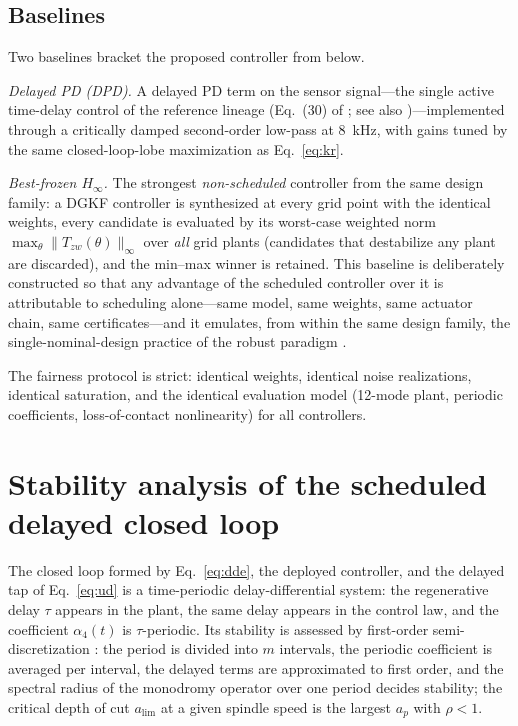 \documentclass[preprint,12pt]{elsarticle}
\newcommand{\hinf}{H_\infty}
\begin{document}
\subsection{Baselines}
\label{sec:baselines}

Two baselines bracket the proposed controller from below.

\emph{Delayed PD (DPD).} A delayed PD term on the sensor signal---the
single active time-delay control of the reference lineage
(Eq.~(30) of \cite{du2024robust}; see also
\cite{du2022timedelay,li2022displacement})---implemented through a
critically damped second-order low-pass at 8~kHz, with gains tuned by
the same closed-loop-lobe maximization as Eq.~\eqref{eq:kr}.

\emph{Best-frozen $\hinf$.} The strongest \emph{non-scheduled}
controller from the same design family: a DGKF controller is synthesized
at every grid point with the identical weights, every candidate is
evaluated by its worst-case weighted norm
$\max_\theta \| T_{zw}(\theta) \|_\infty$ over \emph{all} grid plants
(candidates that destabilize any plant are discarded), and the min--max
winner is retained. This baseline is deliberately constructed so that
any advantage of the scheduled controller over it is attributable to
scheduling alone---same model, same weights, same actuator chain, same
certificates---and it emulates, from within the same design family, the
single-nominal-design practice of the robust paradigm
\cite{du2024robust,du2022modal}.

The fairness protocol is strict: identical weights, identical noise
realizations, identical saturation, and the identical evaluation model
(12-mode plant, periodic coefficients, loss-of-contact nonlinearity) for
all controllers.

\section{Stability analysis of the scheduled delayed closed loop}
\label{sec:stability}

The closed loop formed by Eq.~\eqref{eq:dde}, the deployed controller,
and the delayed tap of Eq.~\eqref{eq:ud} is a time-periodic
delay-differential system: the regenerative delay $\tau$ appears in the
plant, the same delay appears in the control law, and the coefficient
$\alpha_4(t)$ is $\tau$-periodic. Its stability is assessed by
first-order semi-discretization
\cite{insperger2002semi,insperger2004updated,insperger2011semi}: the
period is divided into $m$ intervals, the periodic coefficient is
averaged per interval, the delayed terms are approximated to first
order, and the spectral radius of the monodromy operator over one period
decides stability; the critical depth of cut $a_{\lim}$ at a given
spindle speed is the largest $a_p$ with $\rho < 1$.
\end{document}
